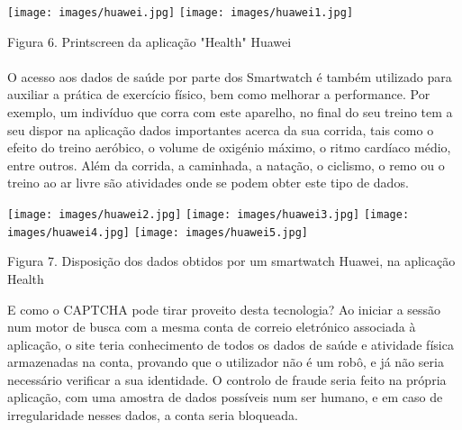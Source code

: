 \documentclass{article}
\begin{document}
	
	

	\begin{center}
	 \texttt{[image: images/huawei.jpg]}
	  \texttt{[image: images/huawei1.jpg]}
	   \newline
	     \caption{Figura 6. Printscreen da aplicação "Health" Huawei}
            \label{fig:my_label}
            
    \end{center}\paragraph{}

        
        
        
        
        
		\paragraph{}O acesso aos dados de saúde por parte dos Smartwatch é também utilizado para auxiliar a prática de exercício físico, bem como melhorar a performance. Por exemplo, um indivíduo que corra com este aparelho, no final do seu treino tem a seu dispor na aplicação dados importantes acerca da sua corrida, tais como o efeito do treino aeróbico, o volume de oxigénio máximo, o ritmo cardíaco médio, entre outros. Além da corrida, a caminhada, a natação, o ciclismo, o remo ou o treino ao ar livre são atividades onde se podem obter este tipo de dados. 
		
		\begin{center}
	 \texttt{[image: images/huawei2.jpg]}
	  \texttt{[image: images/huawei3.jpg]}
	  \texttt{[image: images/huawei4.jpg]}
	  \texttt{[image: images/huawei5.jpg]}
	   \newline
	     \caption{Figura 7. Disposição dos dados obtidos por um smartwatch Huawei, na aplicação Health}
            \label{fig:my_label}
            \end{center}
		
		
			E como o CAPTCHA pode tirar proveito desta tecnologia? Ao iniciar a sessão num motor de busca com a mesma conta de correio eletrónico associada à aplicação, o site teria conhecimento de todos os dados de saúde e atividade física armazenadas na conta, provando que o utilizador não é um robô, e já não seria necessário verificar a sua identidade. O controlo de fraude seria feito na própria aplicação, com uma amostra de dados possíveis num ser humano, e em caso de irregularidade nesses dados, a conta seria bloqueada. 
\end{document}
